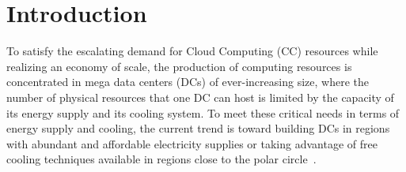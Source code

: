 \section{Introduction\label{sec:intro}}

To satisfy the escalating demand for Cloud Computing (CC) resources while realizing an economy of scale, the production of computing resources is concentrated in mega data centers (DCs) of ever-increasing size, where the number of physical resources that
one DC can host is limited by the capacity of its energy supply and its cooling system. To meet these critical needs in terms of energy supply and
cooling, the current trend is toward building DCs in regions with abundant and affordable electricity supplies or taking advantage of free cooling
techniques available in regions close to the polar circle~\cite{greenpeace:2013}.



